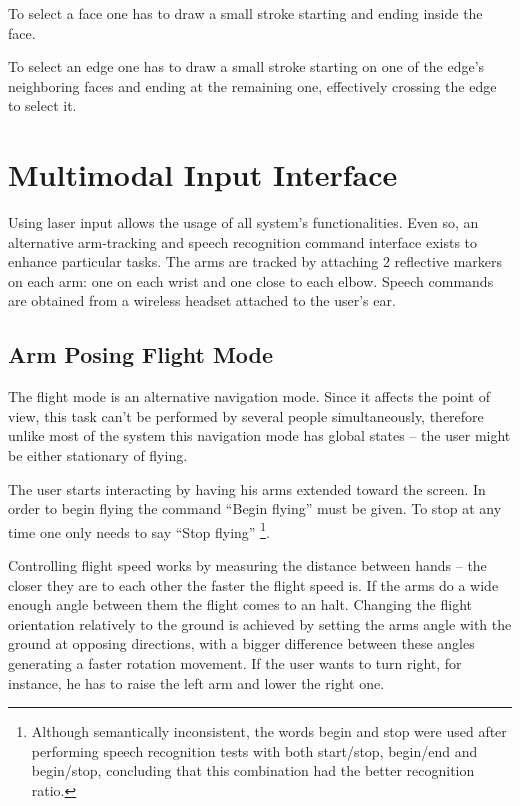 To select a face one has to draw a small stroke starting and ending inside the face.

To select an edge one has to draw a small stroke starting on one of the edge's neighboring faces and ending at the remaining one,
effectively crossing the edge to select it.



\section{Multimodal Input Interface}

Using laser input allows the usage of all system's functionalities.
Even so, an alternative arm-tracking and speech recognition command interface exists to enhance particular tasks.
The arms are tracked by attaching 2 reflective markers on each arm: one on each wrist and one close to each elbow.
Speech commands are obtained from a wireless headset attached to the user's ear.


\subsection{Arm Posing Flight Mode}

The flight mode is an alternative navigation mode. Since it affects the point of view, this task can't be performed by
several people simultaneously, therefore unlike most of the system this navigation mode has global states
-- the user might be either stationary of flying.

The user starts interacting by having his arms extended toward the screen.
In order to begin flying the command ``Begin flying'' must be given.
To stop at any time one only needs to say ``Stop flying''
\footnote{Although semantically inconsistent, the words begin and stop were used after performing speech recognition
tests with both start/stop, begin/end and begin/stop, concluding that this combination had the better recognition ratio.}.

Controlling flight speed works by measuring the distance between hands -- the closer they are to each other the faster
the flight speed is. If the arms do a wide enough angle between them the flight comes to an halt.
Changing the flight orientation relatively to the ground is achieved by setting the arms angle with the ground at opposing directions,
with a bigger difference between these angles generating a faster rotation movement. If the user wants to turn right, for instance,
he has to raise the left arm and lower the right one.


